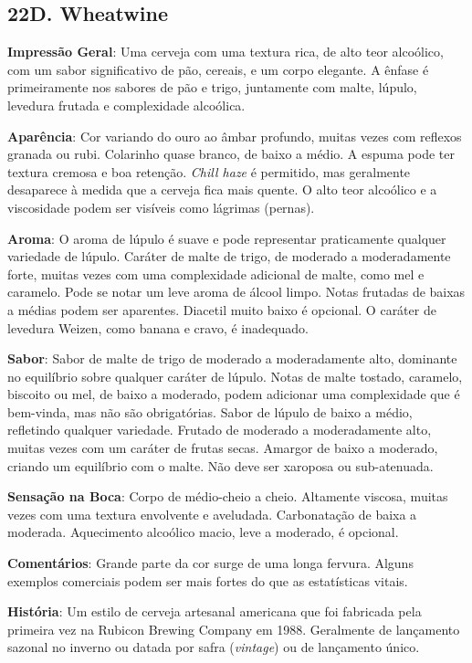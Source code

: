 \subsection*{22D. Wheatwine}
\textbf{Impressão Geral}: Uma cerveja com uma textura rica, de alto teor alcoólico, com um sabor significativo de pão, cereais, e um corpo elegante. A ênfase é primeiramente nos sabores de pão e trigo, juntamente com malte, lúpulo, levedura frutada e complexidade alcoólica.

\textbf{Aparência}: Cor variando do ouro ao âmbar profundo, muitas vezes com reflexos granada ou rubi. Colarinho quase branco, de baixo a médio. A espuma pode ter textura cremosa e boa retenção. \textit{Chill haze} é permitido, mas geralmente desaparece à medida que a cerveja fica mais quente. O alto teor alcoólico e a viscosidade podem ser visíveis como lágrimas (pernas).

\textbf{Aroma}: O aroma de lúpulo é suave e pode representar praticamente qualquer variedade de lúpulo. Caráter de malte de trigo, de moderado a moderadamente forte, muitas vezes com uma complexidade adicional de malte, como mel e caramelo. Pode se notar um leve aroma de álcool limpo. Notas frutadas de baixas a médias podem ser aparentes. Diacetil muito baixo é opcional. O caráter de levedura Weizen, como banana e cravo, é inadequado.

\textbf{Sabor}: Sabor de malte de trigo de moderado a moderadamente alto, dominante no equilíbrio sobre qualquer caráter de lúpulo. Notas de malte tostado, caramelo, biscoito ou mel, de baixo a moderado, podem adicionar uma complexidade que é bem-vinda, mas não são obrigatórias. Sabor de lúpulo de baixo a médio, refletindo qualquer variedade. Frutado de moderado a moderadamente alto, muitas vezes com um caráter de frutas secas. Amargor de baixo a moderado, criando um equilíbrio com o malte. Não deve ser xaroposa ou sub-atenuada.

\textbf{Sensação na Boca}: Corpo de médio-cheio a cheio. Altamente viscosa, muitas vezes com uma textura envolvente e aveludada. Carbonatação de baixa a moderada. Aquecimento alcoólico macio, leve a moderado, é opcional.

\textbf{Comentários}: Grande parte da cor surge de uma longa fervura. Alguns exemplos comerciais podem ser mais fortes do que as estatísticas vitais.

\textbf{História}: Um estilo de cerveja artesanal americana que foi fabricada pela primeira vez na Rubicon Brewing Company em 1988. Geralmente de lançamento sazonal no inverno ou datada por safra (\textit{vintage}) ou de lançamento único.

